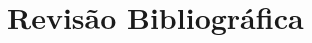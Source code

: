 \documentclass[
	article,			%
	11pt,				%
	oneside,			%
	a4paper,			%
	english,			%
	brazil,				%
	sumario=tradicional	
	]{abntex2}
\begin{document}
%
%
%
%

\section{Revisão Bibliográfica}
\end{document}
